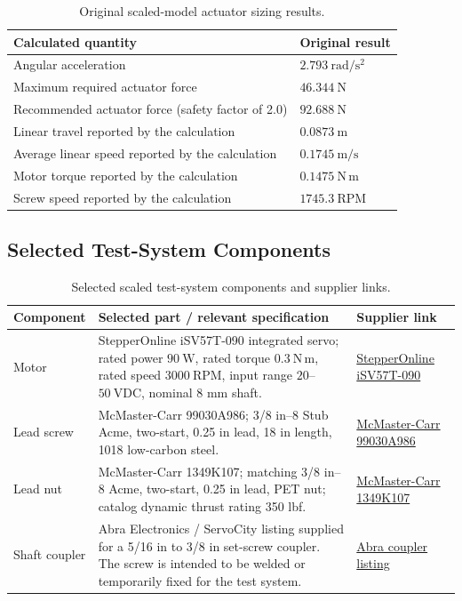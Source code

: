 \documentclass[11pt]{article}
\begin{document}
\begin{table}[h!]
\centering
\begin{tabularx}{\textwidth}{@{}Y l@{}}
\toprule
\textbf{Calculated quantity} & \textbf{Original result} \\
\midrule
Angular acceleration & $2.793\ \mathrm{rad/s^2}$ \\
Maximum required actuator force & $46.344\ \mathrm{N}$ \\
Recommended actuator force (safety factor of 2.0) & $92.688\ \mathrm{N}$ \\
Linear travel reported by the calculation & $0.0873\ \mathrm{m}$ \\
Average linear speed reported by the calculation & $0.1745\ \mathrm{m/s}$ \\
Motor torque reported by the calculation & $0.1475\ \mathrm{N\,m}$ \\
Screw speed reported by the calculation & $1745.3\ \mathrm{RPM}$ \\
\bottomrule
\end{tabularx}
\caption{Original scaled-model actuator sizing results.}
\end{table}

\subsection{Selected Test-System Components}

\begin{table}[h!]
\centering
\begin{tabularx}{\textwidth}{@{}l Y Y@{}}
\toprule
\textbf{Component} & \textbf{Selected part / relevant specification} & \textbf{Supplier link} \\
\midrule
Motor & StepperOnline iSV57T-090 integrated servo; rated power $90\ \mathrm{W}$, rated torque $0.3\ \mathrm{N\,m}$, rated speed $3000\ \mathrm{RPM}$, input range $20$--$50\ \mathrm{VDC}$, nominal 8 mm shaft. & \href{https://www.stepperonline.ca/nema-23-integrated-easy-servo-motor-90w-3000rpm-0-3nm-42-49oz-in-20-50vdc-brushless-dc-servo-motor-isv57t-090.html}{StepperOnline iSV57T-090} \\
\addlinespace
Lead screw & McMaster-Carr 99030A986; 3/8 in--8 Stub Acme, two-start, 0.25 in lead, 18 in length, 1018 low-carbon steel. & \href{https://www.mcmaster.com/99030A986/}{McMaster-Carr 99030A986} \\
\addlinespace
Lead nut & McMaster-Carr 1349K107; matching 3/8 in--8 Acme, two-start, 0.25 in lead, PET nut; catalog dynamic thrust rating 350 lbf. & \href{https://www.mcmaster.com/1349K107/}{McMaster-Carr 1349K107} \\
\addlinespace
Shaft coupler & Abra Electronics / ServoCity listing supplied for a 5/16 in to 3/8 in set-screw coupler. The screw is intended to be welded or temporarily fixed for the test system. & \href{https://abra-electronics.com/robotics-actobotics-servocity/motion-en/couplers/set-screw-shaft-couplers/625126-5-16-to-5-16-set-screw-shaft-coupler-actobotics-clone.html}{Abra coupler listing} \\
\bottomrule
\end{tabularx}
\caption{Selected scaled test-system components and supplier links.}
\end{table}
\end{document}
